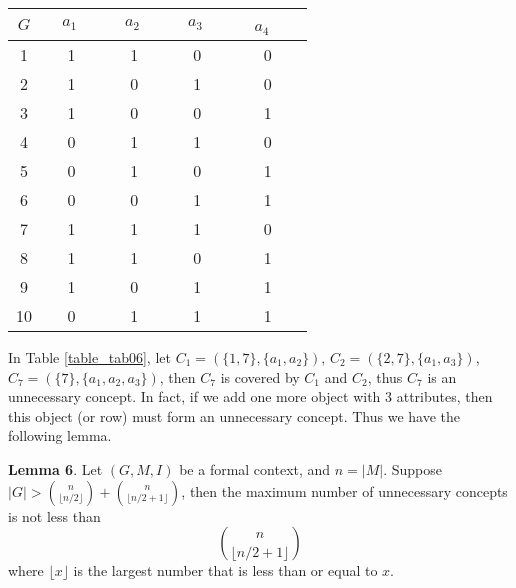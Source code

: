 \documentclass[11pt]{article}
\numberwithin{equation}{subsection}
\begin{document}
 \begin{table*}[ht]
            \begin{center}
                \begin{normalsize}
                    \caption{Formal context $(G, M, I_6)$}
                    \label{table_tab06}
                    \begin{tabular}
                        {|c|c c  c  c  |}
                        \hline
                        $G$     & $\ \ \ \ a_1\ \ \ \ \ $       &  $\ \ \ \ a_2\ \ \ \ \ $  &  $\ \ \ \ a_3\ \ \ \ \ $  & $\ \  \ \ \ a_4\ \ \ \ $  \   \\
                       \hline
 1 & 1   & 1  &  0  & 0  \\

 2 & 1  &  0  & 1   &  0     \\

 3 & 1   & 0 &  0  &  1      \\

4 & 0 &  1  & 1    & 0      \\

5 & 0 &  1  &  0   &  1    \\

6 & 0 &  0  &   1  &  1    \\

7 & 1 &  1  &  1   &  0    \\

8 & 1 &  1  &  0 &  1    \\

9 & 1 &  0  &  1 &  1   \\

10 & 0 &  1  &  1 &  1    \\

\hline
                    \end{tabular}
                \end{normalsize}
            \end{center}
        \end{table*}



 In Table \ref{table_tab06}, let $C_1=(\{1,7 \},\{a_1, a_2 \}) $,  $C_2=(\{2,7 \},\{a_1, a_3 \}) $, $C_7=(\{7 \},\{a_1, a_2, a_3 \})$, then
 $C_7$ is covered by $C_1$ and $C_2$, thus $C_7$ is an unnecessary concept. In fact,
 if we add one more object with 3 attributes, then this object (or row) must form an unnecessary concept. Thus we have the following lemma.



\textbf{ Lemma 6}. Let $(G, M, I)$ be a formal context, and   $n=|M|$. Suppose $|G|>\binom{n }{\lfloor n/2\rfloor} + \binom{n }{\lfloor n/2 + 1\rfloor}$, then    the maximum number of   unnecessary concepts is not less than \[
\binom{n }{\lfloor n/2 + 1\rfloor}
  \]
 where $\lfloor x\rfloor$ is the largest number that is less than or equal to $x$.
\end{document}
